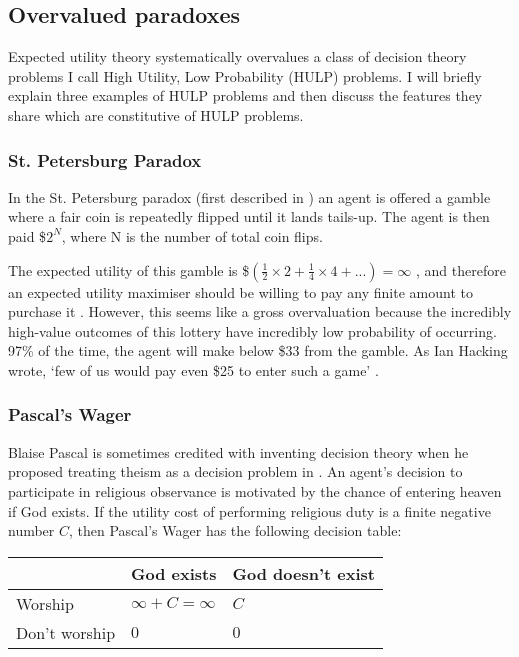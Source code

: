 \documentclass{article}
\begin{document}
\subsection {Overvalued paradoxes}

Expected utility theory systematically overvalues a class of decision theory problems I call High Utility, Low Probability (HULP) problems. I will briefly explain three examples of HULP problems and then discuss the features they share which are constitutive of HULP problems.

\subsubsection {St. Petersburg Paradox}

In the St. Petersburg paradox (first described in \citep{bernoulli1954exposition}) an agent is offered a gamble where a fair coin is repeatedly flipped until it lands tails-up. The agent is then paid \$\(2^N\), where N is the number of total coin flips.

The expected utility of this gamble is \$\((\frac{1}{2}\times2 + \frac{1}{4}\times4+...) = \infty\) , and therefore an expected utility maximiser should be willing to pay any finite amount to purchase it \citep{resnik1987choices}. However, this seems like a gross overvaluation because the incredibly high-value outcomes of this lottery have incredibly low probability of occurring. 97\% of the time, the agent will make below \$33 from the gamble. As Ian Hacking wrote, `few of us would pay even \$25 to enter such
 a game' \citep{hacking1980strange}. %

\subsubsection {Pascal's Wager}

Blaise Pascal is sometimes credited with inventing decision theory when he proposed treating theism as a decision problem in \citep{pascal1852pensees}. An agent's decision to participate in religious observance is motivated by the chance of entering heaven if God exists. If the utility cost of performing religious duty is a finite negative number \(C\), then Pascal's Wager has the following decision table:

\begin{center}
\begin{tabular}{ | l | l | l |}
  \hline
    & God exists & God doesn't exist \\ \hline
  Worship & \(\infty+C=\infty\) & \(C\) \\ \hline
  Don't worship & \(0\)  & \(0\) \\
  \hline
\end{tabular}
\end{center}
\end{document}
